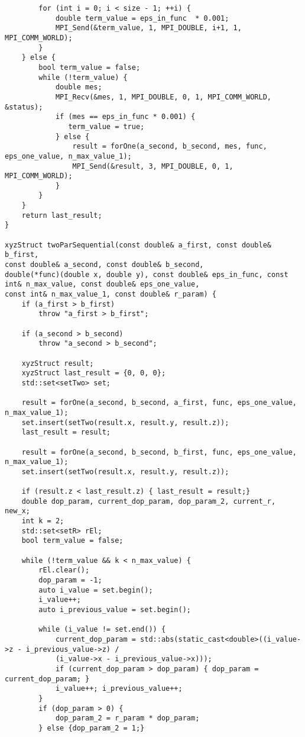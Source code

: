 \documentclass{report}
\begin{document}
\begin{lstlisting}
        for (int i = 0; i < size - 1; ++i) {
            double term_value = eps_in_func  * 0.001;
            MPI_Send(&term_value, 1, MPI_DOUBLE, i+1, 1, MPI_COMM_WORLD);
        }
    } else {
        bool term_value = false;
        while (!term_value) {
            double mes;
            MPI_Recv(&mes, 1, MPI_DOUBLE, 0, 1, MPI_COMM_WORLD, &status);
            if (mes == eps_in_func * 0.001) {
               term_value = true;
            } else {
                result = forOne(a_second, b_second, mes, func, eps_one_value, n_max_value_1);
                MPI_Send(&result, 3, MPI_DOUBLE, 0, 1, MPI_COMM_WORLD);
            }
        }
    }
    return last_result;
}

xyzStruct twoParSequential(const double& a_first, const double& b_first,
const double& a_second, const double& b_second,
double(*func)(double x, double y), const double& eps_in_func, const int& n_max_value, const double& eps_one_value,
const int& n_max_value_1, const double& r_param) {
    if (a_first > b_first)
        throw "a_first > b_first";

    if (a_second > b_second)
        throw "a_second > b_second";

    xyzStruct result;
    xyzStruct last_result = {0, 0, 0};
    std::set<setTwo> set;

    result = forOne(a_second, b_second, a_first, func, eps_one_value, n_max_value_1);
    set.insert(setTwo(result.x, result.y, result.z));
    last_result = result;

    result = forOne(a_second, b_second, b_first, func, eps_one_value, n_max_value_1);
    set.insert(setTwo(result.x, result.y, result.z));

    if (result.z < last_result.z) { last_result = result;}
    double dop_param, current_dop_param, dop_param_2, current_r, new_x;
    int k = 2;
    std::set<setR> rEl;
    bool term_value = false;

    while (!term_value && k < n_max_value) {
        rEl.clear();
        dop_param = -1;
        auto i_value = set.begin();
        i_value++;
        auto i_previous_value = set.begin();

        while (i_value != set.end()) {
            current_dop_param = std::abs(static_cast<double>((i_value->z - i_previous_value->z) /
            (i_value->x - i_previous_value->x)));
            if (current_dop_param > dop_param) { dop_param = current_dop_param; }
            i_value++; i_previous_value++;
        }
        if (dop_param > 0) {
            dop_param_2 = r_param * dop_param;
        } else {dop_param_2 = 1;}


\end{lstlisting}
\end{document}

